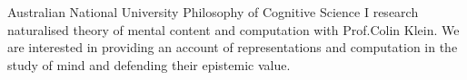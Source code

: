 {Australian National University}
{Philosophy of Cognitive Science}
{
	I research naturalised theory of mental content and computation with Prof.Colin Klein. We are interested in providing an account of representations and computation in the study of mind and defending their epistemic value.
}